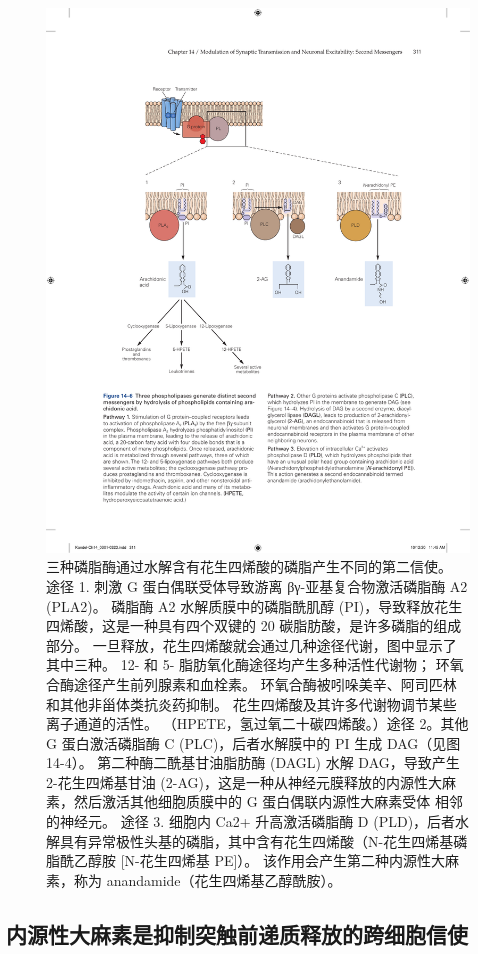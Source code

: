 \begin{figure}[htbp]
	\centering
	\includegraphics[width=0.8\linewidth]{chap14/fig_14_6}
	\caption{三种磷脂酶通过水解含有花生四烯酸的磷脂产生不同的第二信使。 途径 1. 刺激 G 蛋白偶联受体导致游离 βγ-亚基复合物激活磷脂酶 A2 (PLA2)。 磷脂酶 A2 水解质膜中的磷脂酰肌醇 (PI)，导致释放花生四烯酸，这是一种具有四个双键的 20 碳脂肪酸，是许多磷脂的组成部分。 一旦释放，花生四烯酸就会通过几种途径代谢，图中显示了其中三种。 12- 和 5- 脂肪氧化酶途径均产生多种活性代谢物； 环氧合酶途径产生前列腺素和血栓素。 环氧合酶被吲哚美辛、阿司匹林和其他非甾体类抗炎药抑制。 花生四烯酸及其许多代谢物调节某些离子通道的活性。 （HPETE，氢过氧二十碳四烯酸。）途径 2。其他 G 蛋白激活磷脂酶 C (PLC)，后者水解膜中的 PI 生成 DAG（见图 14-4）。 第二种酶二酰基甘油脂肪酶 (DAGL) 水解 DAG，导致产生 2-花生四烯基甘油 (2-AG)，这是一种从神经元膜释放的内源性大麻素，然后激活其他细胞质膜中的 G 蛋白偶联内源性大麻素受体 相邻的神经元。 途径 3. 细胞内 Ca2+ 升高激活磷脂酶 D (PLD)，后者水解具有异常极性头基的磷脂，其中含有花生四烯酸（N-花生四烯基磷脂酰乙醇胺 [N-花生四烯基 PE]）。 该作用会产生第二种内源性大麻素，称为 anandamide（花生四烯基乙醇酰胺）。}
	\label{fig:14_6}
\end{figure}



\subsection{内源性大麻素是抑制突触前递质释放的跨细胞信使}

